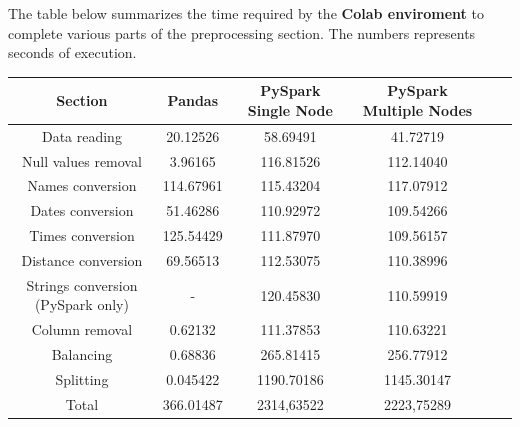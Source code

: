 \documentclass[
	letterpaper, %
	10pt, %
]{class}
\begin{document}
The table below summarizes the time required by the \textbf{Colab enviroment} to complete various parts of the preprocessing section.
The numbers represents seconds of execution.

\begin{center}
    \begin{tabular}{ |c|c|c|c|c|c| }
        \hline
        Section                           & Pandas    & PySpark Single Node & PySpark Multiple Nodes \\
        \hline
        Data reading                      & 20.12526  & 58.69491                   & 41.72719                      \\
        Null values removal               & 3.96165   & 116.81526                   & 112.14040                      \\
        Names conversion                  & 114.67961 & 115.43204                   & 117.07912                      \\
        Dates conversion                  & 51.46286  & 110.92972                   & 109.54266                      \\
        Times conversion                  & 125.54429 & 111.87970                   & 109.56157                      \\
        Distance conversion               & 69.56513  & 112.53075                   & 110.38996                      \\
        Strings conversion (PySpark only) & -         & 120.45830                   & 110.59919                      \\
        Column removal                    & 0.62132   & 111.37853                   & 110.63221                      \\
        Balancing                         & 0.68836   & 265.81415                   & 256.77912                      \\
        Splitting                         & 0.045422  & 1190.70186                   & 1145.30147                      \\
        Total                             & 366.01487 & 2314,63522                   & 2223,75289                      \\

        \hline
    \end{tabular}
\end{center}
\end{document}
